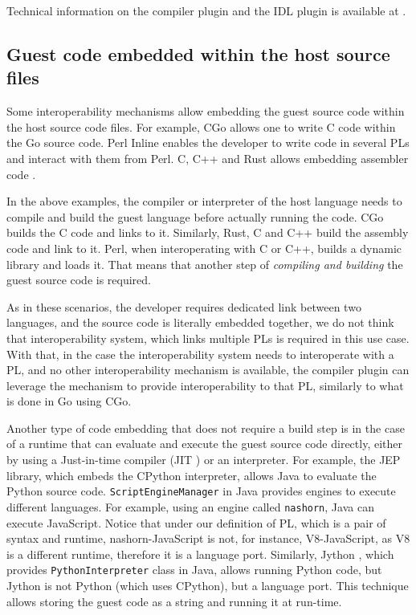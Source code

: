 \documentclass[sigplan,10pt,manuscript,nonacm]{acmart}
\begin{document}
Technical information on the compiler plugin and the IDL plugin is available at \cite{metaffi_paper}.

\subsection{Guest code embedded within the host source files}

Some interoperability mechanisms allow embedding the guest source code within the host source code files. For example, CGo \cite{cgo_export_c} allows one to write C code within the Go source code. Perl \cite{perl} Inline \cite{pern_inline} enables the developer to write code in several PLs and interact with them from Perl. C, C++ and Rust \cite{rust} allows embedding assembler code \cite{c_asm} \cite{rust_asm}.

In the above examples, the compiler or interpreter of the host language needs to compile and build the guest language before actually running the code. CGo builds the C code and links to it. Similarly, Rust, C and C++ build the assembly code and link to it. Perl, when interoperating with C or C++, builds a dynamic library and loads it. That means that another step of \textit{compiling and building} the guest source code is required.

As in these scenarios, the developer requires dedicated link between two languages, and the source code is literally embedded together, we do not think that interoperability system, which links multiple PLs is required in this use case. With that, in the case the interoperability system needs to interoperate with a PL, and no other interoperability mechanism is available, the compiler plugin can leverage the mechanism to provide interoperability to that PL, similarly to what is done in Go using CGo.

Another type of code embedding that does not require a build step is in the case of a runtime that can evaluate and execute the guest source code directly, either by using a Just-in-time compiler (JIT \cite{jit}) or an interpreter. For example, the JEP \cite{java_jep} library, which embeds the CPython interpreter, allows Java to evaluate the Python source code. \texttt{ScriptEngineManager} in Java provides engines to execute different languages. For example, using an engine called \texttt{nashorn}, Java can execute JavaScript. Notice that under our definition of PL, which is a pair of syntax and runtime, nashorn-JavaScript is not, for instance, V8-JavaScript, as V8 \cite{v8_js} is a different runtime, therefore it is a language port. Similarly, Jython \cite{jython}, which provides \texttt{PythonInterpreter} class in Java, allows running Python code, but Jython is not Python (which uses CPython), but a language port. This technique allows storing the guest code as a string and running it at run-time.
\end{document}
